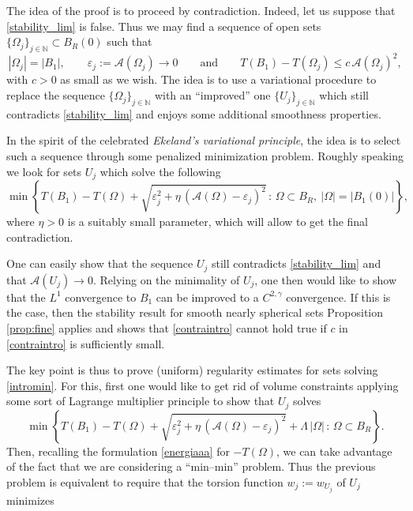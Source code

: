 \documentclass{amsart}
\theoremstyle{definition}
\numberwithin{equation}{section}
\begin{document}
The idea of the proof is to proceed by contradiction. Indeed, let us suppose that \eqref{stability_lim} is false. Thus we may find a sequence of open sets \(\{\Omega_j\}_{j\in\mathbb{N}}\subset B_R(0)\) such that
\begin{equation}
\label{contraintro}
|\Omega_j|=|B_1|, \qquad \varepsilon_j:=\mathcal A (\Omega_j)\to 0\qquad \text{and} \qquad T(B_1)-T(\Omega_j)\le c\, \mathcal A(\Omega_j)^2,
\end{equation}
with \(c>0\) as small as we wish. The idea is to use a variational procedure to replace the sequence $\{\Omega_j\}_{j\in\mathbb{N}}$ with an ``improved''  one  \(\{U_j\}_{j\in\mathbb{N}}\) which still contradicts \eqref{stability_lim} and enjoys some additional smoothness properties. 
\par
In the spirit of the celebrated {\it Ekeland's variational principle}, the idea is to select such a sequence through some penalized minimization problem. Roughly speaking we look for sets \(U_j\) which solve the following 
\begin{equation}
\label{intromin}
\min\left\{T(B_1)-T(\Omega)+\sqrt{\varepsilon_j^2+\eta\,(\mathcal A(\Omega)-\varepsilon_j)^2}\,:\, \Omega\subset B_R,\ |\Omega|=|B_1(0)| \right\},
\end{equation}
where $\eta>0$ is a suitably small parameter, which will allow to get the final contradiction.
\par
One can easily show that the sequence \(U_j\) still contradicts \eqref{stability_lim} and  that \(\mathcal{A}(U_j)\to 0\). Relying on the minimality  of \(U_j\), one then would like to show that the \(L^1\) convergence to \(B_1\) can be improved to a $C^{2,\gamma}$ convergence. If this is the case, then the stability result for smooth nearly spherical sets Proposition \ref{prop:fine} applies and shows that \eqref{contraintro} cannot hold true if \(c\) in \eqref{contraintro} is sufficiently small. 
\par
The key point is thus to prove (uniform) regularity estimates for sets solving \eqref{intromin}. For this, first one would like to get rid of volume constraints applying some sort of Lagrange multiplier principle to show that \(U_j\) solves
\begin{equation}
\label{lagrange}
\min\left\{T(B_1)-T(\Omega)+\sqrt{\varepsilon_j^2+\eta\,(\mathcal A(\Omega)-\varepsilon_j)^2}+\Lambda\,|\Omega|\,:\, \Omega\subset B_R\right\}.
\end{equation}
Then, recalling the formulation \eqref{energiaaa} for $-T(\Omega)$, we can take advantage of the fact that we are considering  a ``min--min'' problem. Thus the previous problem is equivalent to require that the torsion function $w_j:=w_{U_j}$ of $U_j$ minimizes  
\end{document}
